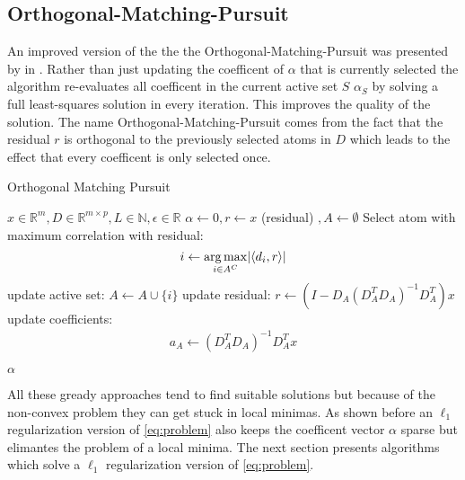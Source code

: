 \subsection{Orthogonal-Matching-Pursuit}
\label{sec:omp}

An improved version of the  the the Orthogonal-Matching-Pursuit  was presented by in \cite{Pati1993}.
Rather than just updating the coefficent of $\alpha$ that is currently selected  the algorithm re-evaluates all coefficent in the current active set $S$ 
 $\alpha_S$ by solving a full least-squares solution in every iteration. This improves the quality of the solution. \cite{OMP}
The name Orthogonal-Matching-Pursuit comes from the fact that the residual $r$ is orthogonal to the previously selected atoms in $D$ which leads to the effect that every coefficent is only selected once.


\begin{algorithm}
\caption{Orthogonal Matching Pursuit}
\label{alg:omp}
\begin{algorithmic}[1]
\REQUIRE $x \in \mathbb{R}^m, D \in \mathbb{R}^{m\times p}, L \in \mathbb{N}, \epsilon \in \mathbb{R}$
\STATE $\alpha \gets 0, r \gets x $ (residual) $, A \gets \emptyset$
\STATE Select atom with maximum correlation with residual: 
\begin{equation*}
i \gets \operatorname*{arg\,max}_{i \in A^C} \lvert \left<d_i,r\right> \rvert
\end{equation*}
\STATE update active set: $A \gets A \cup \{i\} $
\STATE update residual: $r \gets \left(I-D_A\left( D_A^T D_A \right)^{-1} D_A^T \right)x$
\STATE update coefficients: 
\begin{align}
a_A \gets \left( D_A^T D_A \right)^{-1} D_A^T x  \label{eq:omp_update}
\end{align}

\ENDFOR
\RETURN $\alpha$
\end{algorithmic}
\end{algorithm}


All these gready approaches tend to find suitable solutions but because of the non-convex problem they can get stuck in local minimas.
As shown before an $\ell_1$ regularization version of \ref{eq:problem} also keeps the coefficent vector $\alpha$ sparse but elimantes the problem of a local minima.
The next section presents algorithms which solve  a $\ell_1$ regularization version of \ref{eq:problem}.



